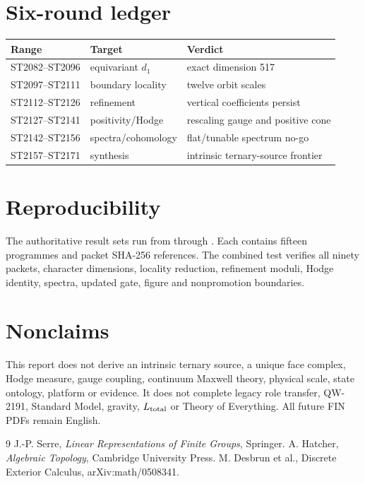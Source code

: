 \documentclass[11pt,a4paper]{article}
\begin{document}
\appendix
\section{Six-round ledger}
\begin{longtable}{@{}p{}p{}p{}@{}}
\toprule
Range & Target & Verdict \\
\midrule\endhead
ST2082--ST2096 & equivariant $d_1$ & exact dimension 517 \\
ST2097--ST2111 & boundary locality & twelve orbit scales \\
ST2112--ST2126 & refinement & vertical coefficients persist \\
ST2127--ST2141 & positivity/Hodge & rescaling gauge and positive cone \\
ST2142--ST2156 & spectra/cohomology & flat/tunable spectrum no-go \\
ST2157--ST2171 & synthesis & intrinsic ternary-source frontier \\
\bottomrule
\end{longtable}

\section{Reproducibility}
The authoritative result sets run from
 through
.  Each contains fifteen programmes and
packet SHA-256 references.  The combined test
 verifies all ninety packets, character
dimensions, locality reduction, refinement moduli, Hodge identity, spectra,
updated gate, figure and nonpromotion boundaries.

\section{Nonclaims}
This report does not derive an intrinsic ternary source, a unique face complex,
Hodge measure, gauge coupling, continuum Maxwell theory, physical scale, state
ontology, platform or evidence.  It does not complete legacy role transfer,
QW-2191, Standard Model, gravity, $L_{\rm total}$ or Theory of Everything.  All
future FIN PDFs remain English.

\begin{thebibliography}{9}
 J.-P. Serre, \emph{Linear Representations of Finite Groups}, Springer.
 A. Hatcher, \emph{Algebraic Topology}, Cambridge University Press.
 M. Desbrun et al., Discrete Exterior Calculus, arXiv:math/0508341.
\end{thebibliography}
\end{document}
